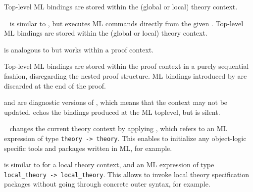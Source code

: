 \begin{isabellebody}
\begin{isamarkuptext}
\begin{description}
  Top-level ML bindings are stored within the (global or local) theory
  context.
  
  \item \hyperlink{command.ML}{\mbox{}}~ is similar to \hyperlink{command.use}{\mbox{}},
  but executes ML commands directly from the given .
  Top-level ML bindings are stored within the (global or local) theory
  context.

  \item \hyperlink{command.ML-prf}{\mbox{}} is analogous to \hyperlink{command.ML}{\mbox{}} but works
  within a proof context.

  Top-level ML bindings are stored within the proof context in a
  purely sequential fashion, disregarding the nested proof structure.
  ML bindings introduced by \hyperlink{command.ML-prf}{\mbox{}} are discarded at the
  end of the proof.

  \item \hyperlink{command.ML-val}{\mbox{}} and \hyperlink{command.ML-command}{\mbox{}} are diagnostic
  versions of \hyperlink{command.ML}{\mbox{}}, which means that the context may not be
  updated.  \hyperlink{command.ML-val}{\mbox{}} echos the bindings produced at the ML
  toplevel, but \hyperlink{command.ML-command}{\mbox{}} is silent.
  
  \item \hyperlink{command.setup}{\mbox{}}~ changes the current theory
  context by applying , which refers to an ML expression
  of type \verb|theory -> theory|.  This enables to initialize
  any object-logic specific tools and packages written in ML, for
  example.

  \item \hyperlink{command.local-setup}{\mbox{}} is similar to \hyperlink{command.setup}{\mbox{}} for
  a local theory context, and an ML expression of type \verb|local_theory -> local_theory|.  This allows to
  invoke local theory specification packages without going through
  concrete outer syntax, for example.


\end{description}
\end{isamarkuptext}
\end{isabellebody}
